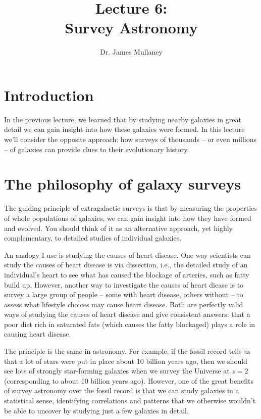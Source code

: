 \documentclass[11pt]{article}
\begin{document}
 
\title{Lecture 6:\\Survey Astronomy}
\author{Dr. James Mullaney}
\maketitle

\section{Introduction}
In the previous lecture, we learned that by studying nearby galaxies in
great detail we can gain insight into how these galaxies were
formed. In this lecture we'll consider the opposite approach: how
surveys of thousands -- or even millions -- of galaxies can provide
clues to their evolutionary history.

\section{The philosophy of galaxy surveys}
The guiding principle of extragalactic surveys is that by measuring
the properties of whole populations of galaxies, we can gain insight
into how they have formed and evolved. You should think of it as an
alternative approach, yet highly complementary, to detailed studies of
individual galaxies.

An analogy I use is studying the causes of heart disease. One way
scientists can study the causes of heart disease is via dissection,
i.e., the detailed study of an individual's heart to see what has
caused the blockage of arteries, such as fatty build up. However,
another way to investigate the causes of heart diease is to survey a
large group of people -- some with heart disease, others without -- to
assess what lifestyle choices may cause heart disease. Both are
perfectly valid ways of studying the causes of heart disease and give
consistent answers: that a poor diet rich in saturated fats (which
causes the fatty blockaged) plays a role in causing heart disease.

The principle is the same in astronomy. For example, if the fossil
record tells us that a lot of stars were put in place about 10 billion
years ago, then we should see lots of strongly star-forming galaxies
when we survey the Universe at $z=2$ (corresponding to about 10
billion years ago). However, one of the great benefits of survey
astronomy over the fossil record is that we can study galaxies in a
statistical sense, identifying correlations and patterns that we
otherwise wouldn't be able to uncover by studying just a few galaxies
in detail.
\end{document}
